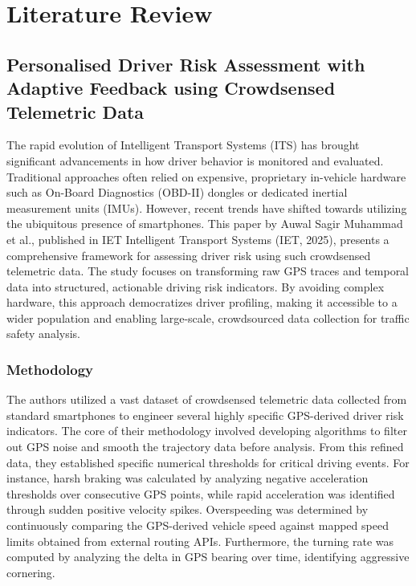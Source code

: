 \chapter{Literature Review}

\section{Personalised Driver Risk Assessment with Adaptive Feedback using Crowdsensed Telemetric Data}

The rapid evolution of Intelligent Transport Systems (ITS) has brought significant advancements in how driver behavior is monitored and evaluated. Traditional approaches often relied on expensive, proprietary in-vehicle hardware such as On-Board Diagnostics (OBD-II) dongles or dedicated inertial measurement units (IMUs). However, recent trends have shifted towards utilizing the ubiquitous presence of smartphones. This paper by Auwal Sagir Muhammad et al., published in IET Intelligent Transport Systems (IET, 2025), presents a comprehensive framework for assessing driver risk using such crowdsensed telemetric data. The study focuses on transforming raw GPS traces and temporal data into structured, actionable driving risk indicators. By avoiding complex hardware, this approach democratizes driver profiling, making it accessible to a wider population and enabling large-scale, crowdsourced data collection for traffic safety analysis.

\subsection{Methodology}
The authors utilized a vast dataset of crowdsensed telemetric data collected from standard smartphones to engineer several highly specific GPS-derived driver risk indicators. The core of their methodology involved developing algorithms to filter out GPS noise and smooth the trajectory data before analysis. From this refined data, they established specific numerical thresholds for critical driving events. For instance, harsh braking was calculated by analyzing negative acceleration thresholds over consecutive GPS points, while rapid acceleration was identified through sudden positive velocity spikes. Overspeeding was determined by continuously comparing the GPS-derived vehicle speed against mapped speed limits obtained from external routing APIs. Furthermore, the turning rate was computed by analyzing the delta in GPS bearing over time, identifying aggressive cornering. 

